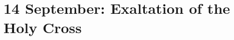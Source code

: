 {
\section{14 September: Exaltation of the Holy Cross}
\subtitle{ Class}
\subtitle{I \& II Vespers}
\medskip

\def\definevesperspropers{}
\def\definevesperspropersalt{%
}
\def\vesperspropersnote{At II Vespers:}
\def\vesperspropersaltnote{\oldneedspace{10\baselineskip}At I Vespers:}
\def\postpsalmtitlethree{\oldneedspace{9\baselineskip}}
\def\prepsalmtitlefour{\needspace{8\baselineskip}}
\def\prepsalmtitlefive{\needspace{8\baselineskip}}
\def\prehymn{\printnote{All kneel for the sixth verse of the following hymn.}}
\def\prehymntranslation{\oldneedspace{3\baselineskip}}

\def\begincollectcols{\begin{parcolumns}[rulebetween,colwidths={1=0.42\linewidth}]{2}}
\bigskip
\benedicamusdomino[2]{}
}